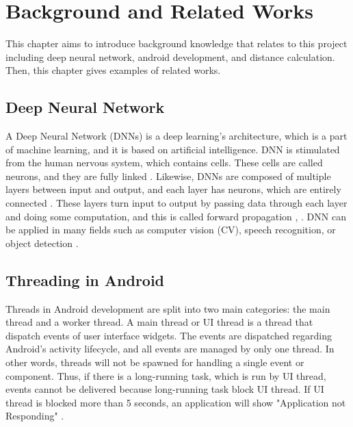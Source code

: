 \chapter{Background and Related Works}\label{background}

    This chapter aims to introduce background knowledge that relates to this project including deep neural network, android development, and distance calculation.
    Then, this chapter gives examples of related works.

    \section{Deep Neural Network}
        A Deep Neural Network (DNNs) is a deep learning's architecture,
        which is a part of machine learning, and it is based on artificial intelligence.
        DNN is stimulated from the human nervous system, which contains cells.
        These cells are called neurons, and they are fully linked \cite{deep-learing-2}.
        Likewise, DNNs are composed of multiple layers between input and output,
        and each layer has neurons, which are entirely connected \cite{deep-learing-3}.
        These layers turn input to output by passing data through each layer and doing some computation,
        and this is called forward propagation \cite{deep-learing-2}, \cite{deep-learing-1}.
        DNN can be applied in many fields such as computer vision (CV), speech recognition, or object detection \cite{deep-learing-1}.


    \section{Threading in Android}
        Threads in Android development are split into two main categories: the main thread and a worker thread.
        A main thread or UI thread is a thread that dispatch events of user interface widgets.
        The events are dispatched regarding Android's activity lifecycle,
        and all events are managed by only one thread.
        In other words, threads will not be spawned for handling a single event or component.
        Thus, if there is a long-running task, which is run by UI thread, events cannot be delivered
        because long-running task block UI thread.
        If UI thread is blocked more than 5 seconds,
        an application will show "Application not Responding"  \cite{ANDROID-01}.

